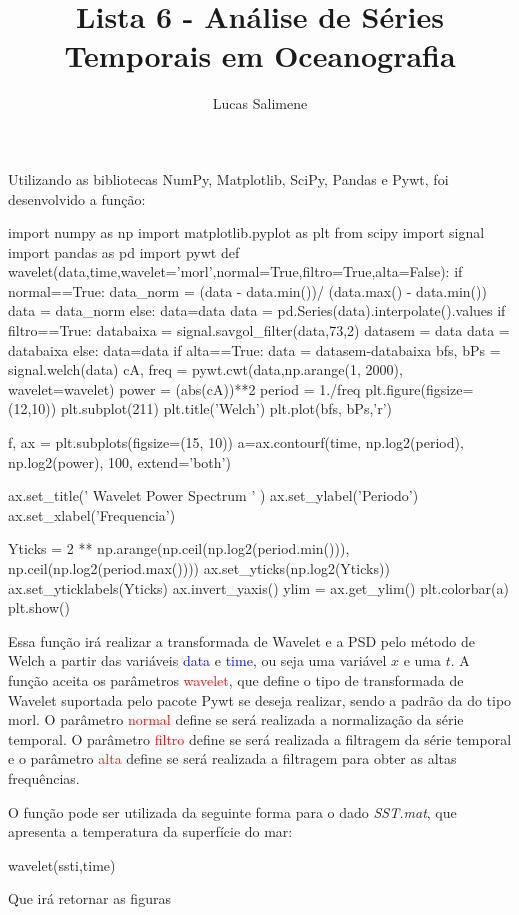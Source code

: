 \documentclass[12pt,a4paper,portuguese]{article}
\title{Lista 6 - Análise de Séries Temporais em Oceanografia}
\author{Lucas Salimene}
\date{}
\begin{document}
\maketitle
\newpage

Utilizando as bibliotecas NumPy, Matplotlib, SciPy, Pandas e Pywt, foi desenvolvido a função:

\begin{python}
import numpy as np
import matplotlib.pyplot as plt
from scipy import signal
import pandas as pd
import pywt 
def wavelet(data,time,wavelet='morl',normal=True,filtro=True,alta=False):
if normal==True:
data_norm = (data - data.min())/ (data.max() - data.min())
data = data_norm
else:
data=data
data = pd.Series(data).interpolate().values
if filtro==True:
databaixa = signal.savgol_filter(data,73,2)
datasem = data
data = databaixa
else:
data=data
if alta==True:
data = datasem-databaixa
bfs, bPs = signal.welch(data)
cA, freq = pywt.cwt(data,np.arange(1, 2000), wavelet=wavelet)
power = (abs(cA))**2
period = 1./freq
plt.figure(figsize=(12,10))
plt.subplot(211)
plt.title('Welch')
plt.plot(bfs, bPs,'r')

f, ax = plt.subplots(figsize=(15, 10))
a=ax.contourf(time, np.log2(period), np.log2(power), 100,
extend='both')

ax.set_title(' Wavelet Power Spectrum ' )
ax.set_ylabel('Periodo')
ax.set_xlabel('Frequencia')

Yticks = 2 ** np.arange(np.ceil(np.log2(period.min())),
np.ceil(np.log2(period.max())))
ax.set_yticks(np.log2(Yticks))
ax.set_yticklabels(Yticks)
ax.invert_yaxis()
ylim = ax.get_ylim()
plt.colorbar(a)
plt.show()
\end{python}
Essa função irá realizar a transformada de Wavelet e a PSD pelo método de Welch a partir das variáveis \textcolor{blue}{data} e \textcolor{blue}{time}, ou seja uma variável $x$ e uma $t$. A função aceita os parâmetros \textcolor{red}{wavelet}, que define o tipo de transformada de Wavelet suportada pelo pacote Pywt se deseja realizar, sendo a padrão da do tipo morl. O parâmetro \textcolor{red}{normal} define se será realizada a normalização da série temporal. O parâmetro \textcolor{red}{filtro} define se será realizada a filtragem da série temporal e o parâmetro \textcolor{red}{alta} define se será realizada a filtragem para obter as altas frequências. 

O função pode ser utilizada da seguinte forma para o dado \textit{SST.mat}, que apresenta a temperatura da superfície do mar:
\begin{python}
wavelet(ssti,time)
\end{python}
Que irá retornar as figuras
\end{document}
